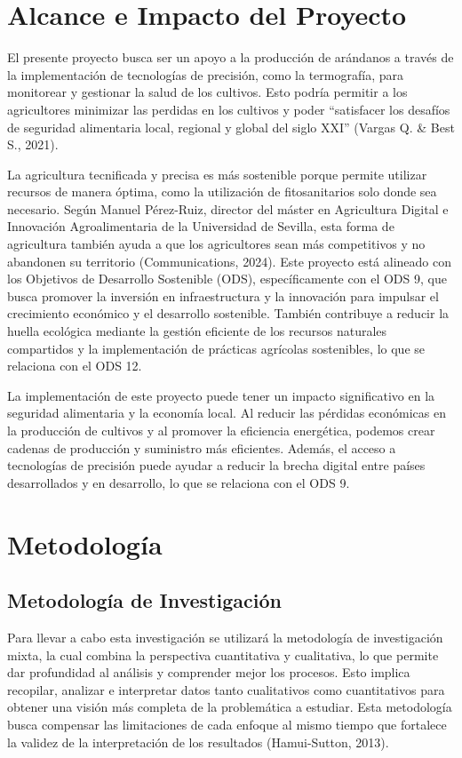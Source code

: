 \section{ Alcance e Impacto del Proyecto }
El presente proyecto busca ser un apoyo a la producción de arándanos a través de la implementación de tecnologías de precisión, como la termografía, para monitorear y gestionar la salud de los cultivos. Esto podría permitir a los agricultores minimizar las perdidas en los cultivos y poder “satisfacer los desafíos de seguridad alimentaria local, regional y global del siglo XXI” (Vargas Q. \& Best S., 2021).

\bigskip
La agricultura tecnificada y precisa es más sostenible porque permite utilizar recursos de manera óptima, como la utilización de fitosanitarios solo donde sea necesario. Según Manuel Pérez-Ruiz, director del máster en Agricultura Digital e Innovación Agroalimentaria de la Universidad de Sevilla, esta forma de agricultura también ayuda a que los agricultores sean más competitivos y no abandonen su territorio (Communications, 2024).
Este proyecto está alineado con los Objetivos de Desarrollo Sostenible (ODS), específicamente con el ODS 9, que busca promover la inversión en infraestructura y la innovación para impulsar el crecimiento económico y el desarrollo sostenible. También contribuye a reducir la huella ecológica mediante la gestión eficiente de los recursos naturales compartidos y la implementación de prácticas agrícolas sostenibles, lo que se relaciona con el ODS 12.

\bigskip
La implementación de este proyecto puede tener un impacto significativo en la seguridad alimentaria y la economía local. Al reducir las pérdidas económicas en la producción de cultivos y al promover la eficiencia energética, podemos crear cadenas de producción y suministro más eficientes. Además, el acceso a tecnologías de precisión puede ayudar a reducir la brecha digital entre países desarrollados y en desarrollo, lo que se relaciona con el ODS 9.


\section{Metodología}
\subsection{Metodología de Investigación}
Para llevar a cabo esta investigación se utilizará la metodología de investigación mixta, la cual combina la perspectiva cuantitativa y cualitativa, lo que permite dar profundidad al análisis y comprender mejor los procesos. Esto implica recopilar, analizar e interpretar datos tanto cualitativos como cuantitativos para obtener una visión más completa de la problemática a estudiar. Esta metodología busca compensar las limitaciones de cada enfoque al mismo tiempo que fortalece la validez de la interpretación de los resultados (Hamui-Sutton, 2013).

